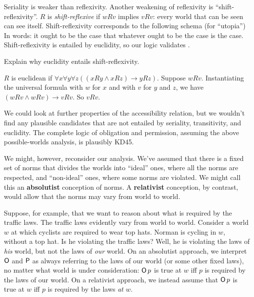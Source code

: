 Seriality is weaker than reflexivity. Another weakening of reflexivity is
``shift-reflexivity''. $R$ is \emph{shift-reflexive} if $wRv$ implies $vRv$:
every world that can be seen can see itself. Shift-reflexivity corresponds to
the following schema  (for ``utopia'')
%
%
In words: it ought to be the case that whatever ought to be the case is the
case. Shift-reflexivity is entailed by euclidity, so our logic validates .

\begin{exercise}\label{ex:shiftref}
  Explain why euclidity entails shift-reflexivity.
\end{exercise}
\begin{solution}
  $R$ is euclidean if $\forall x \forall y \forall z((xRy \land xRz) \to yRz)$.
  Suppose $wRv$. Instantiating the universal formula with $w$ for $x$ and with
  $v$ for $y$ and $z$, we have $(wRv \land wRv) \to vRv$. So $vRv$.
\end{solution}

We could look at further properties of the accessibility relation, but we
wouldn't find any plausible candidates that are not entailed by seriality,
transitivity, and euclidity. The complete logic of obligation and permission,
assuming the above possible-worlds analysis, is plausibly KD45.

We might, however, reconsider our analysis. We've assumed that there is a fixed
set of norms that divides the worlds into ``ideal'' ones, where all the norms
are respected, and ``non-ideal'' ones, where some norms are violated. We might
call this an \textbf{absolutist} conception of norms. A \textbf{relativist}
conception, by contrast, would allow that the norms may vary from world to
world.

Suppose, for example, that we want to reason about what is required by the
traffic laws. The traffic laws evidently vary from world to world. Consider a
world $w$ at which cyclists are required to wear top hats. Norman is cycling in
$w$, without a top hat. Is he violating the traffic laws? Well, he is violating
the laws of \emph{his} world, but not the laws of \emph{our} world. On an
absolutist approach, we interpret $\operatorname{\mathsf{O}}$ and $\operatorname{\mathsf{P}}$ as always referring to the
laws of our world (or some other fixed laws), no matter what world is under
consideration: $\operatorname{\mathsf{O}} p$ is true at $w$ iff $p$ is required by the laws of our
world. On a relativist approach, we instead assume that $\operatorname{\mathsf{O}} p$ is true at $w$
iff $p$ is required by the laws \emph{at $w$}.

